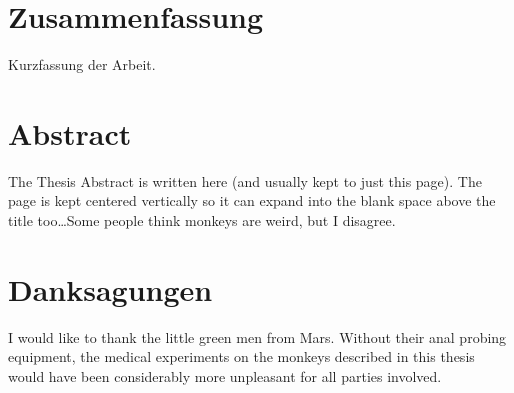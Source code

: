 
\chapter*{Zusammenfassung}
\begin{otherlanguage}{ngerman}
  Kurzfassung der Arbeit.
\end{otherlanguage}
\clearpage

\chapter*{Abstract}
\begin{otherlanguage}{american}
  The Thesis Abstract is written here (and usually kept to just this
  page). The page is kept centered vertically so it can expand into
  the blank space above the title too\ldots Some people think monkeys
  are weird, but I disagree.
\end{otherlanguage}
\clearpage

\chapter*{Danksagungen}
I would like to thank the little green men from Mars. Without their
anal probing equipment, the medical experiments on the monkeys
described in this thesis would have been considerably more unpleasant
for all parties involved.
\clearpage


